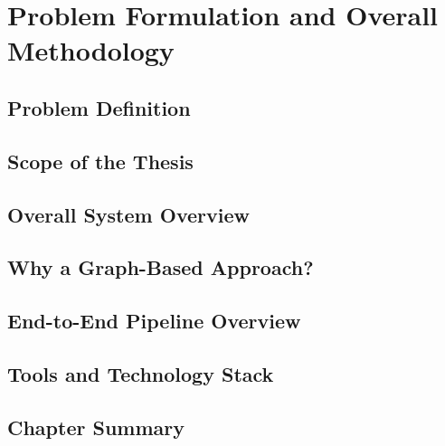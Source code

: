 \chapter{Problem Formulation and Overall Methodology}

\section{Problem Definition}
\section{Scope of the Thesis}
\section{Overall System Overview}
\section{Why a Graph-Based Approach?}
\section{End-to-End Pipeline Overview}
\section{Tools and Technology Stack}
\section{Chapter Summary}
